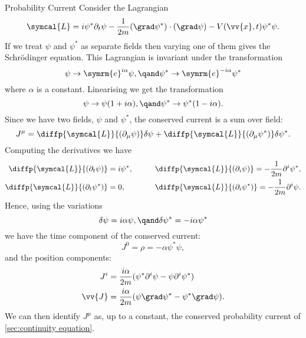 \documentclass[fleqn]{NotesClass}
\newcommand{\e}{\symrm{e}}
\newcommand{\lagrangianDensity}{\symcal{L}}
\begin{document}
    \begin{exm}{Probability Current}{}
        Consider the Lagrangian
        \begin{equation}
            \lagrangianDensity = i\psi^* \partial_t \psi - \frac{1}{2m} (\grad\psi^*) \cdot (\grad\psi) - V(\vv{x}, t)\psi^* \psi.
        \end{equation}
        If we treat \(\psi\) and \(\psi^*\) as separate fields then varying one of them gives the Schrödinger equation.
        This Lagrangian is invariant under the transformation
        \begin{equation}
            \psi \to \e^{i\alpha}\psi, \qand \psi^* \to \e^{-i\alpha}\psi^*
        \end{equation}
        where \(\alpha\) is a constant.
        Linearising we get the transformation
        \begin{equation}
            \psi \to \psi(1 + i\alpha), \qand \psi^* \to \psi^*(1 - i\alpha).
        \end{equation}
        Since we have two fields, \(\psi\) and \(\psi^*\), the conserved current is a sum over field:
        \begin{equation}
            J^\mu = \diffp{\lagrangianDensity}{(\partial_\mu \psi)} \delta \psi + \diffp{\lagrangianDensity}{(\partial_\mu \psi^*)} \delta \psi^*.
        \end{equation}
        Computing the derivatives we have
        \begin{align}
            \diffp{\lagrangianDensity}{(\partial_t \psi)} &= i\psi^*, \qquad & \diffp{\lagrangianDensity}{(\partial_i \psi)} = -\frac{1}{2m}\partial^i \psi^*,\\
            \diffp{\lagrangianDensity}{(\partial_t \psi^*)} &= 0, \qquad & \diffp{\lagrangianDensity}{(\partial_i \psi^*)} = -\frac{1}{2m}\partial^i \psi.
        \end{align}
        Hence, using the variations
        \begin{equation}
            \delta \psi = i\alpha \psi, \qand \delta \psi^* = -i\alpha \psi^*
        \end{equation}
        we have the time component of the conserved current:
        \begin{equation}
            J^0 = \rho = -\alpha \psi^*\psi,
        \end{equation}
        and the position components:
        \begin{align}
            J^i &= \frac{i\alpha}{2m}(\psi^* \partial^i \psi - \psi \partial^i \psi^*)\\
            \vv{J} &= \frac{i\alpha}{2m}(\psi \grad \psi^* - \psi^* \grad \psi).
        \end{align}
        We can then identify \(J^\mu\) as, up to a constant, the conserved probability current of \cref{sec:continuity equation}.
    \end{exm}
    
\end{document}
